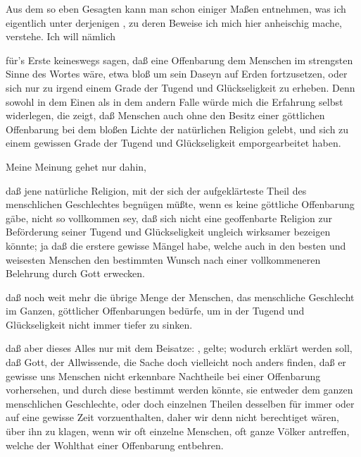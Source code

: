 Aus dem so eben Gesagten kann man schon einiger Maßen entnehmen, was ich eigentlich unter derjenigen , zu deren Beweise ich mich hier anheischig mache, verstehe. Ich will nämlich
\begin{aufza}
\item für's Erste keineswegs sagen, daß eine Offenbarung dem Menschen im strengsten Sinne des Wortes  wäre, etwa bloß um sein Daseyn auf Erden fortzusetzen, oder sich nur zu irgend einem Grade der Tugend und Glückseligkeit zu erheben. Denn sowohl in dem Einen als in dem andern Falle würde mich die Erfahrung selbst widerlegen, die zeigt, daß Menschen auch ohne den Besitz einer göttlichen Offenbarung bei dem bloßen Lichte der natürlichen Religion gelebt, und sich zu einem gewissen Grade der Tugend und Glückseligkeit emporgearbeitet haben.
\item Meine Meinung gehet nur dahin,
\begin{aufzb}
\item daß jene natürliche Religion, mit der sich der aufgeklärteste Theil des menschlichen Geschlechtes begnügen müßte, wenn es keine göttliche Offenbarung gäbe, nicht so vollkommen sey, daß sich nicht eine geoffenbarte Religion zur Beförderung seiner Tugend und Glückseligkeit ungleich wirksamer bezeigen könnte; ja daß die erstere gewisse Mängel habe, welche auch in den besten und weisesten Menschen den bestimmten Wunsch nach einer vollkommeneren Belehrung durch Gott erwecken.~
\item daß noch weit mehr die übrige Menge der Menschen, das menschliche Geschlecht im Ganzen, göttlicher Offenbarungen bedürfe, um in der Tugend und Glückseligkeit nicht immer tiefer zu sinken.
\item daß aber dieses Alles nur mit dem Beisatze: , gelte; wodurch erklärt werden soll, daß Gott, der Allwissende, die Sache doch vielleicht noch anders finden, daß er gewisse uns Menschen nicht erkennbare Nachtheile bei einer Offenbarung vorhersehen, und durch diese bestimmt werden könnte, sie entweder dem ganzen menschlichen Geschlechte, oder doch einzelnen Theilen desselben für immer oder auf eine gewisse Zeit vorzuenthalten, daher wir denn nicht berechtiget wären, über ihn zu klagen, wenn wir oft einzelne Menschen, oft ganze Völker antreffen, welche der Wohlthat einer Offenbarung entbehren.
\begin{RWanm} 

\end{RWanm}
\end{aufzb}
\end{aufza}
